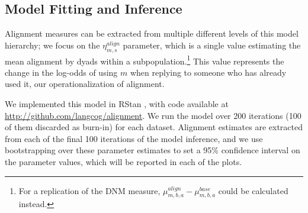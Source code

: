 \documentclass{acm_proc_article-sp}
\begin{document}
\subsection{Model Fitting and Inference}
Alignment measures can be extracted from multiple different levels of this model hierarchy; we focus on the $\eta^{align}_{m,s}$ parameter, which is a single value estimating the mean alignment by dyads within a subpopulation.\footnote{For a replication of the DNM measure, $\mu^{align}_{m,b,a}-\mu^{base}_{m,b,a}$ could be calculated instead.}  This value represents the change in the log-odds of using $m$ when replying to someone who has already used it, our operationalization of alignment.

We implemented this model in RStan \cite{?}, with code available at \url{http://github.com/langcog/alignment}. We run the model over 200 iterations (100 of them discarded as burn-in) for each dataset.  Alignment estimates are extracted from each of the final 100 iterations of the model inference, and we use bootstrapping over these parameter estimates to set a 95\% confidence interval on the parameter values, which will be reported in each of the plots.


\end{document}
